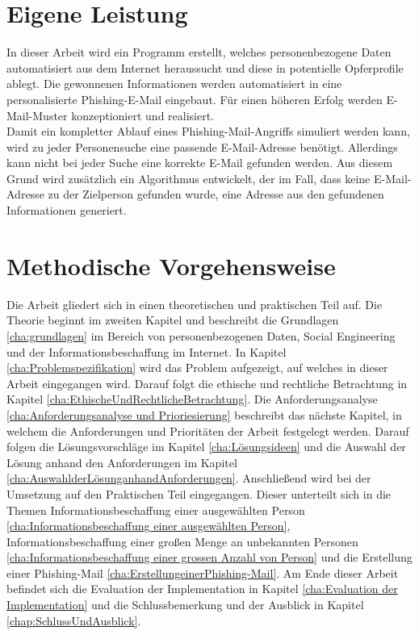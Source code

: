 

 	
\section{Eigene Leistung}
\label {sec:Eigene Leistung} 
In dieser Arbeit wird ein Programm erstellt, welches personenbezogene Daten automatisiert aus dem Internet heraussucht und diese in potentielle Opferprofile ablegt. Die gewonnenen Informationen werden  automatisiert in eine personalisierte Phishing-E-Mail eingebaut. Für einen höheren Erfolg werden E-Mail-Muster konzeptioniert und realisiert.\\
Damit ein kompletter Ablauf eines Phishing-Mail-Angriffs simuliert werden kann, wird zu jeder Personensuche eine passende E-Mail-Adresse benötigt. Allerdings kann nicht bei jeder Suche eine korrekte E-Mail gefunden werden. Aus diesem Grund wird zusätzlich ein Algorithmus entwickelt, der im Fall, dass keine E-Mail-Adresse zu der Zielperson gefunden wurde, eine Adresse aus den gefundenen Informationen generiert.

\section{Methodische Vorgehensweise}
\label {sec:Aufbau der Arbeit} 
Die Arbeit gliedert sich in einen theoretischen und praktischen Teil auf. Die Theorie beginnt im zweiten Kapitel und beschreibt die Grundlagen \ref{cha:grundlagen} im Bereich von personenbezogenen Daten, Social Engineering und der Informationsbeschaffung im Internet. In Kapitel \ref{cha:Problemspezifikation} wird das Problem aufgezeigt, auf welches in dieser Arbeit eingegangen wird. Darauf folgt die ethische und rechtliche Betrachtung in Kapitel \ref{cha:EthischeUndRechtlicheBetrachtung}. Die Anforderungsanalyse \ref{cha:Anforderungsanalyse und Prioriesierung} beschreibt das nächste Kapitel, in welchem die Anforderungen und Prioritäten der Arbeit festgelegt werden. Darauf folgen die Lösungsvorschläge im Kapitel \ref{cha:Lösungsideen} und die Auswahl der Lösung anhand den Anforderungen im Kapitel \ref{cha:AuswahlderLösunganhandAnforderungen}. Anschließend wird bei der Umsetzung auf den Praktischen Teil eingegangen. Dieser unterteilt sich in die Themen Informationsbeschaffung einer ausgewählten Person \ref{cha:Informationsbeschaffung einer ausgewählten Person}, Informationsbeschaffung einer großen Menge an unbekannten Personen \ref{cha:Informationsbeschaffung einer grossen Anzahl von Person} und die Erstellung einer Phishing-Mail \ref{cha:ErstellungeinerPhishing-Mail}. Am Ende dieser Arbeit befindet sich die Evaluation der Implementation in Kapitel \ref{cha:Evaluation der Implementation} und die Schlussbemerkung und der Ausblick in Kapitel \ref{chap:SchlussUndAusblick}.






